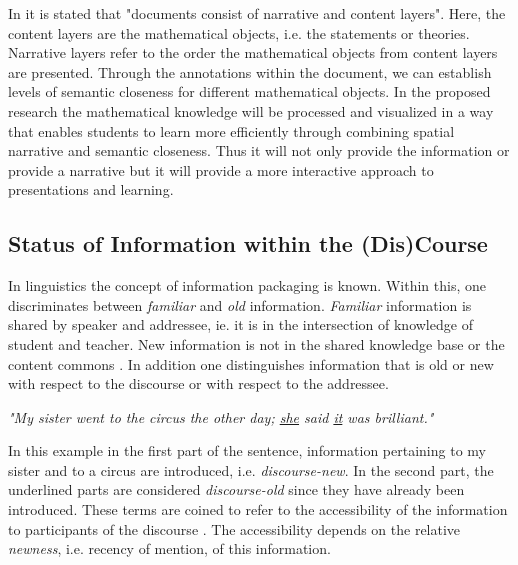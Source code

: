 \documentclass[twoside]{article}
\begin{document}
In \cite{LK:MathOntoAuthDoc09} it is stated that "documents consist of narrative and content layers". Here, the content layers are the mathematical objects, i.e. the statements or theories. Narrative layers refer to the order the mathematical objects from content layers are presented. Through the annotations within the document, we can establish levels of semantic closeness for different mathematical objects. In the proposed research the mathematical knowledge will be processed and visualized in a way that enables students to learn more efficiently through combining spatial narrative and semantic closeness. Thus it will not only provide the information or provide a narrative but it will provide a more interactive approach to presentations and learning.\\

\subsection{Status of Information within the (Dis)Course}
\label{sec:infostatus}

In linguistics the concept of information packaging \cite{CambridgeGrammar:npentrel14} is known. Within this, one discriminates between \textit{familiar} and \textit{old} information. \textit{Familiar} information is shared by speaker and addressee, ie. it is in the intersection of knowledge of student and teacher. New information is not in the shared knowledge base or the content commons \cite{CNX:whitepaper}. In addition one distinguishes information that is old or new with respect to the discourse or with respect to the addressee.

\begin{center}
\textit{"My sister went to the circus the other day; \underline{she} said \underline{it} was brilliant."}\\
\end{center}

In this example in the first part of the sentence, information pertaining to my sister and to a circus are introduced, i.e. \textit{discourse-new}. In the second part, the underlined parts are considered \textit{discourse-old} since they have already been introduced. These terms are coined to refer to the accessibility of the information to participants of the discourse \cite{Newness:npentrel14}. The accessibility depends on the relative \textit{newness}, i.e. recency of mention, of this information.\\
\end{document}
